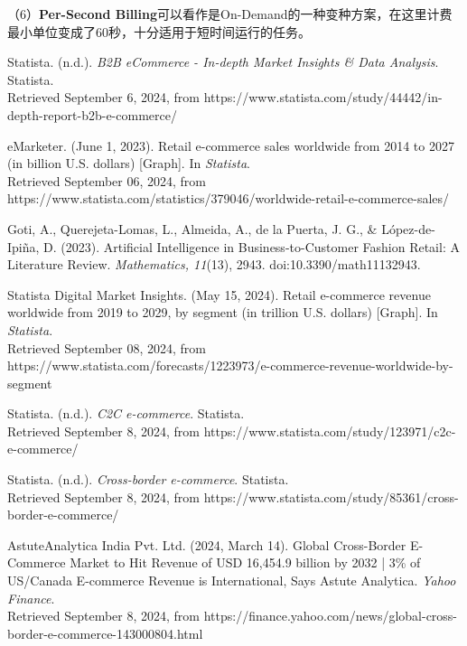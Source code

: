 \documentclass[12pt]{ctexart}
\begin{document}
（6）\textbf{Per-Second Billing}可以看作是On-Demand的一种变种方案，在这里计费最小单位变成了60秒，十分适用于短时间运行的任务。


\newpage
{}
\begin{thebibliography}{99}

     Statista. (n.d.). \textit{B2B eCommerce - In-depth Market Insights \& Data Analysis}. Statista. \\ Retrieved September 6, 2024, from https://www.statista.com/study/44442/in-depth-report-b2b-e-commerce/
    
     eMarketer. (June 1, 2023). Retail e-commerce sales worldwide from 2014 to 2027 (in billion U.S. dollars) [Graph]. In \textit{Statista}. \\ Retrieved September 06, 2024, from https://www.statista.com/statistics/379046/worldwide-retail-e-commerce-sales/

     Goti, A., Querejeta-Lomas, L., Almeida, A., de la Puerta, J. G., \& López-de-Ipiña, D. (2023). Artificial Intelligence in Business-to-Customer Fashion Retail: A Literature Review. \textit{Mathematics, 11}(13), 2943. doi:10.3390/math11132943.

     Statista Digital Market Insights. (May 15, 2024). Retail e-commerce revenue worldwide from 2019 to 2029, by segment (in trillion U.S. dollars) [Graph]. In \textit{Statista}. \\ Retrieved September 08, 2024, from https://www.statista.com/forecasts/1223973/e-commerce-revenue-worldwide-by-segment

     Statista. (n.d.). \textit{C2C e-commerce}. Statista. \\ Retrieved September 8, 2024, from https://www.statista.com/study/123971/c2c-e-commerce/

     Statista. (n.d.). \textit{Cross-border e-commerce}. Statista. \\ Retrieved September 8, 2024, from https://www.statista.com/study/85361/cross-border-e-commerce/

     AstuteAnalytica India Pvt. Ltd. (2024, March 14). Global Cross-Border E-Commerce Market to Hit Revenue of USD 16,454.9 billion by 2032 | 3\% of US/Canada E-commerce Revenue is International, Says Astute Analytica. \textit{Yahoo Finance}. \\ Retrieved September 8, 2024, from https://finance.yahoo.com/news/global-cross-border-e-commerce-143000804.html


\end{thebibliography}
\end{document}
